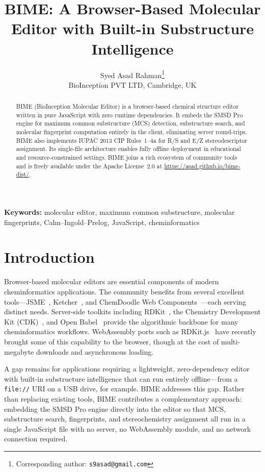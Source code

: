 \documentclass[twocolumn]{article}
\title{BIME: A Browser-Based Molecular Editor with Built-in Substructure Intelligence}
\author{
  Syed Asad Rahman\thanks{Corresponding author: \texttt{s9asad@gmail.com}} \\
  BioInception PVT LTD, Cambridge, UK
}
\date{}
\begin{document}
\maketitle

\begin{abstract}
BIME (BioInception Molecular Editor) is a browser-based chemical
structure editor written in pure JavaScript with zero runtime
dependencies.  It embeds the SMSD Pro engine for maximum common
substructure (MCS) detection, substructure search, and molecular
fingerprint computation entirely in the client, eliminating
server round-trips.  BIME also implements IUPAC 2013 CIP Rules~1--4a
for R/S and E/Z stereodescriptor assignment.  Its single-file
architecture enables fully offline deployment in educational and
resource-constrained settings.  BIME joins a rich ecosystem of
community tools and is freely available under the Apache
License~2.0 at \url{https://asad.github.io/bime-dist/}.
\end{abstract}

\noindent\textbf{Keywords:} molecular editor, maximum common
substructure, molecular fingerprints, Cahn--Ingold--Prelog,
JavaScript, cheminformatics

\section{Introduction}

Browser-based molecular editors are essential components of modern
cheminformatics applications.  The community benefits from several
excellent tools---JSME~\cite{Bienfait2013}, Ketcher~\cite{Ketcher2024},
and ChemDoodle Web Components~\cite{Burger2015}---each serving distinct
needs.  Server-side toolkits including RDKit~\cite{Landrum2006},
the Chemistry Development Kit (CDK)~\cite{Steinbeck2003}, and
Open Babel~\cite{OBoyle2011} provide the algorithmic backbone for
many cheminformatics workflows.  WebAssembly ports such as
RDKit.js~\cite{RDKitJS2024} have recently brought some of this
capability to the browser, though at the cost of multi-megabyte
downloads and asynchronous loading.

A gap remains for applications requiring a lightweight, zero-dependency
editor with built-in substructure intelligence that can run entirely
offline---from a \texttt{file://} URI on a USB drive, for example.
BIME addresses this gap.  Rather than replacing existing tools, BIME
contributes a complementary approach: embedding the SMSD Pro engine
directly into the editor so that MCS, substructure search, fingerprints,
and stereochemistry assignment all run in a single JavaScript file
with no server, no WebAssembly module, and no network connection
required.
\end{document}
